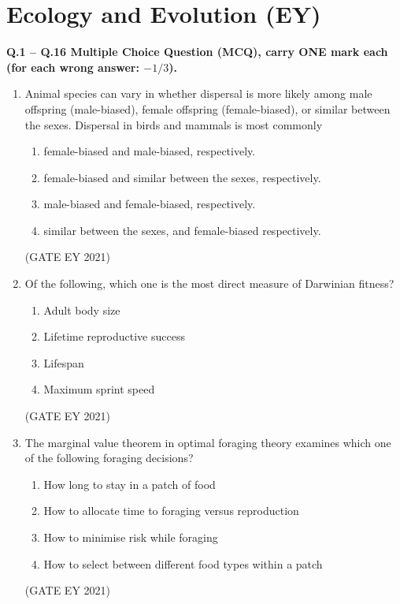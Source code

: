 \documentclass[journal]{IEEEtran}
\begin{document}
\section*{\textbf{Ecology and Evolution (EY)}}
\textbf{Q.1 -- Q.16 Multiple Choice Question (MCQ), carry ONE mark each (for each wrong answer: $-1/3$).}
\begin{enumerate}

    \item Animal species can vary in whether dispersal is more likely among male offspring (male-biased), female offspring (female-biased), or similar between the sexes. Dispersal in birds and mammals is most commonly
    \begin{enumerate}
        \item female-biased and male-biased, respectively.
        \item female-biased and similar between the sexes, respectively.
        \item male-biased and female-biased, respectively.
        \item similar between the sexes, and female-biased respectively.
    \end{enumerate}
    \hfill{(GATE EY 2021)}

    \item Of the following, which one is the most direct measure of Darwinian fitness?
    \begin{multicols}{2}
    \begin{enumerate}
        \item Adult body size
        \item Lifetime reproductive success
        \item Lifespan
        \item Maximum sprint speed
    \end{enumerate}
    \end{multicols}
    \hfill{(GATE EY 2021)}

    \item The marginal value theorem in optimal foraging theory examines which one of the following foraging decisions?
    \begin{enumerate}
        \item How long to stay in a patch of food
        \item How to allocate time to foraging versus reproduction
        \item How to minimise risk while foraging
        \item How to select between different food types within a patch
    \end{enumerate}
    \hfill{(GATE EY 2021)}


\end{enumerate}
\end{document}
